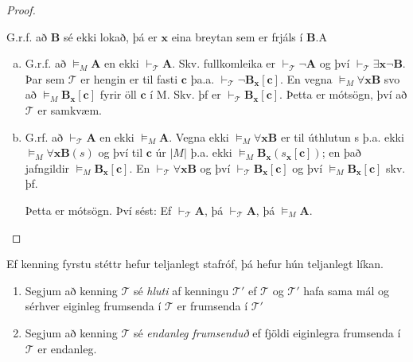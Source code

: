 \documentclass[12pt]{article}
\begin{document}
\begin{setn}
\begin{proof}
\begin{enumerate}[(1)]
      G.r.f. að $\mathbf{B}$ sé ekki lokað, þá er $\mathbf{x}$ eina breytan sem er frjáls í $\mathbf{B}$.A

      \begin{enumerate}[(a)]
      \item  G.r.f. að $\models_M \mathbf{A}$ en  ekki $\vdash_{\mathcal{T}} \mathbf{A}$.
        Skv. fullkomleika er $\vdash_{\mathcal{T}} \lnot \mathbf{A}$ og því
        $\vdash_{\mathcal{T}} \exists \mathbf{x} \lnot \mathbf{B}$. Þar sem
        $\mathcal{T}$ er hengin er til fasti $\mathbf{c}$ þa.a. 
        $\vdash_{\mathcal{T}} \lnot \mathbf{B}_{\mathbf{x}} [\mathbf{c}]$.
        En vegna $\models_M \forall \mathbf{x} \mathbf{B}$ svo að
        $\models_M \mathbf{B}_{\mathbf{x}} [\mathbf{c}]$ fyrir öll
        $\mathbf{c}$ í M.
        Skv. þf er $\vdash_{\mathcal{T}} \mathbf{B}_{\mathbf{x}} [\mathbf{c}]$. 
        Þetta er mótsögn, því að $\mathcal{T}$ er samkvæm.
      \item  G.rf. að $\vdash_{\mathcal{T}} \mathbf{A}$ en ekki $\models_M \mathbf{A}$.
        Vegna ekki $\models_M \forall \mathbf{x} \mathbf{B}$ er til úthlutun s
        þ.a. ekki $\models_M \forall \mathbf{x} \mathbf{B} (s)$ og því til $\mathbf{c}$ úr
        $|M|$ þ.a. ekki $\models_M \mathbf{B}_{\mathbf{x}} ( s_{\mathbf{x}}[\mathbf{c}])$;
        en það jafngildir $\models_M \mathbf{B}_{\mathbf{x}}[\mathbf{c}]$. En 
        $\vdash_{\mathcal{T}} \forall \mathbf{x} \mathbf{B}$ og því
        $\vdash_{\mathcal{T}} \mathbf{B}_{\mathbf{x}} [\mathbf{c}]$ og því
        $\models_M \mathbf{B}_{\mathbf{x}} [\mathbf{c}]$ skv. þf. 

        Þetta er mótsögn. Því sést:
        Ef $\vdash_{\mathcal{T}} \mathbf{A}$, þá $\vdash_{\mathcal{T}} \mathbf{A}$,
        þá $\models_M \mathbf{A}$.
      \end{enumerate}
    \end{enumerate}
    \end{proof}
\end{setn}

\begin{setn}
Ef kenning fyrstu stéttr hefur teljanlegt stafróf,
þá hefur hún teljanlegt líkan.
\end{setn}

\begin{skgr}
  \begin{enumerate}[(1)]
  \item  Segjum að kenning $\mathcal{T}$ sé \emph{hluti}
    af kenningu $\mathcal{T}'$ ef $\mathcal{T}$ og $\mathcal{T}'$ hafa
    sama mál og sérhver eiginleg frumsenda í $\mathcal{T}$ er frumsenda 
    í $\mathcal{T}'$
  \item Segjum að kenning $\mathcal{T}$ sé \emph{endanleg frumsenduð}
    ef fjöldi eiginlegra frumsenda í $\mathcal{T}$ er endanleg.
  \end{enumerate}
\end{skgr}
\end{document}
